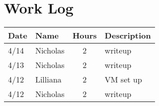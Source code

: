 \documentclass[letterpaper,10pt,fleqn,draftclsnofoot,onecolumn]{IEEEtran}
\begin{document}
	\section*{Work Log}
	\begin{tabular}{l l c p{1.1in}}\textbf{Date} & \textbf{Name} & \textbf{Hours} & \textbf{Description}\\\hline
		4/14 & Nicholas & 2 & writeup\\\hline
		4/13 & Nicholas & 2 & writeup\\\hline
		4/12 & Lilliana & 2 & VM set up\\\hline
		4/12 & Nicholas & 2 & writeup\\\hline
	\end{tabular}
		
		\nocite{*}
		
		
		
	
\end{document}
